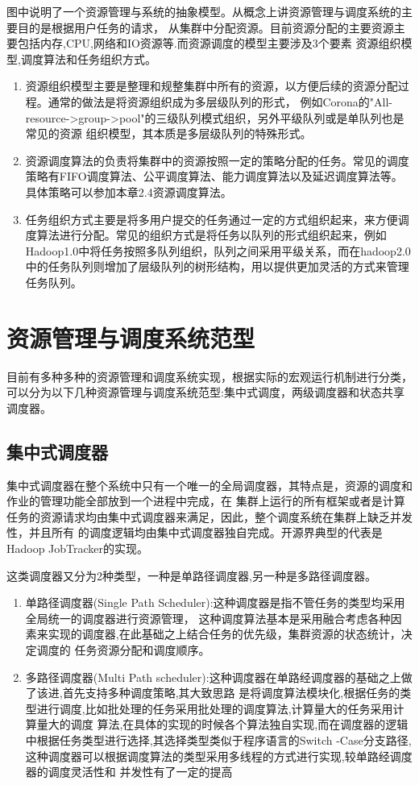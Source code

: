 图中说明了一个资源管理与系统的抽象模型。从概念上讲资源管理与调度系统的主要目的是根据用户任务的请求，
从集群中分配资源。目前资源分配的主要资源主要包括内存,CPU,网络和IO资源等.而资源调度的模型主要涉及3个要素
资源组织模型,调度算法和任务组织方式。
\begin{enumerate}
\item 资源组织模型主要是整理和规整集群中所有的资源，以方便后续的资源分配过程。通常的做法是将资源组织成为多层级队列的形式，
例如Corona的"All-resource->group->pool"的三级队列模式组织，另外平级队列或是单队列也是常见的资源
组织模型，其本质是多层级队列的特殊形式。
\item 资源调度算法的负责将集群中的资源按照一定的策略分配的任务。常见的调度策略有FIFO调度算法、公平调度算法、能力调度算法以及延迟调度算法等。具体策略可以参加本章2.4资源调度算法。
\item 任务组织方式主要是将多用户提交的任务通过一定的方式组织起来，来方便调度算法进行分配。常见的组织方式是将任务以队列的形式组织起来，例如Hadoop1.0中将任务按照多队列组织，队列之间采用平级关系，而在hadoop2.0中的任务队列则增加了层级队列的树形结构，用以提供更加灵活的方式来管理任务队列。
\end{enumerate}
\section{资源管理与调度系统范型}
目前有多种多种的资源管理和调度系统实现，根据实际的宏观运行机制进行分类，可以分为以下几种资源管理与调度系统范型:集中式调度，两级调度器和状态共享调度器。

\subsection{集中式调度器}
集中式调度器在整个系统中只有一个唯一的全局调度器，其特点是，资源的调度和作业的管理功能全部放到一个进程中完成，在
集群上运行的所有框架或者是计算任务的资源请求均由集中式调度器来满足，因此，整个调度系统在集群上缺乏并发性，并且所有
的调度逻辑均由集中式调度器独自完成。开源界典型的代表是Hadoop JobTracker的实现。

这类调度器又分为2种类型，一种是单路径调度器,另一种是多路径调度器。
\begin{enumerate}
\item 单路径调度器(Single Path Scheduler):这种调度器是指不管任务的类型均采用全局统一的调度器进行资源管理，
这种调度算法基本是采用融合考虑各种因素来实现的调度器,在此基础之上结合任务的优先级，集群资源的状态统计，决定调度的
任务资源分配和调度顺序。
\item 多路径调度器(Multi Path scheduler):这种调度器在单路经调度器的基础之上做了该进,首先支持多种调度策略,其大致思路
是将调度算法模块化,根据任务的类型进行调度,比如批处理的任务采用批处理的调度算法,计算量大的任务采用计算量大的调度
算法,在具体的实现的时候各个算法独自实现,而在调度器的逻辑中根据任务类型进行选择,其选择类型类似于程序语言的Switch
-Case分支路径,这种调度器可以根据调度算法的类型采用多线程的方式进行实现,较单路经调度器的调度灵活性和
并发性有了一定的提高
\end{enumerate}

